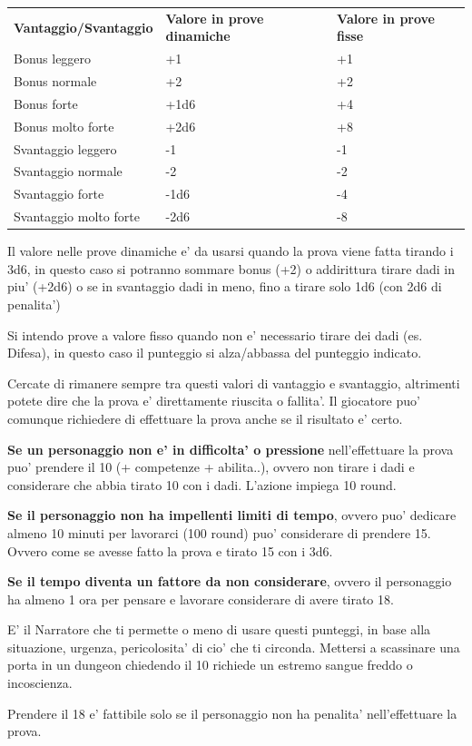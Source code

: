 \documentclass[a4paper,11pt,twoside,openany]{book}
\begin{document}
\begin{tabular}{lll}
\toprule
\textbf{Vantaggio/Svantaggio} & \textbf{Valore in prove dinamiche} & \textbf{Valore in prove fisse}\tabularnewline
Bonus leggero & +1 & +1\tabularnewline
Bonus normale & +2 & +2\tabularnewline
Bonus forte & +1d6 & +4\tabularnewline
Bonus molto forte & +2d6 & +8\tabularnewline
Svantaggio leggero & -1 & -1\tabularnewline
Svantaggio normale & -2 & -2\tabularnewline
Svantaggio forte & -1d6 & -4\tabularnewline
Svantaggio molto forte & -2d6 & -8\tabularnewline

\end{tabular}

\bigskip

Il valore nelle prove dinamiche e' da usarsi quando la prova viene fatta tirando i 3d6, in questo caso si potranno sommare bonus (+2) o addirittura tirare dadi in piu' (+2d6) o se in svantaggio dadi in meno, fino a tirare solo 1d6 (con 2d6 di penalita')

Si intendo prove a valore fisso quando non e' necessario tirare dei dadi (es. Difesa), in questo caso il punteggio si alza/abbassa del punteggio indicato.

Cercate di rimanere sempre tra questi valori di vantaggio e svantaggio, altrimenti potete dire che la prova e' direttamente riuscita o fallita'.
Il giocatore puo' comunque richiedere di effettuare la prova anche se il risultato e' certo.

\textbf{Se un personaggio non e' in difficolta' o pressione} nell'effettuare la prova puo' prendere il 10 (+ competenze + abilita..), ovvero non tirare i dadi e considerare che abbia tirato 10 con i dadi. L'azione impiega 10 round.

\textbf{Se il personaggio non ha impellenti limiti di tempo}, ovvero puo' dedicare almeno 10 minuti per lavorarci (100 round) puo' considerare di prendere 15. Ovvero come se avesse fatto la prova e tirato 15 con i 3d6.

\textbf{Se il tempo diventa un fattore da non considerare}, ovvero il personaggio ha almeno 1 ora per pensare e lavorare considerare di avere tirato 18.

E' il Narratore che ti permette o meno di usare questi punteggi, in base alla situazione, urgenza, pericolosita' di cio' che ti circonda. Mettersi a scassinare una porta in un dungeon chiedendo il 10 richiede un estremo sangue freddo o incoscienza.

Prendere il 18 e' fattibile solo se il personaggio non ha penalita'
nell'effettuare la prova.
\end{document}
